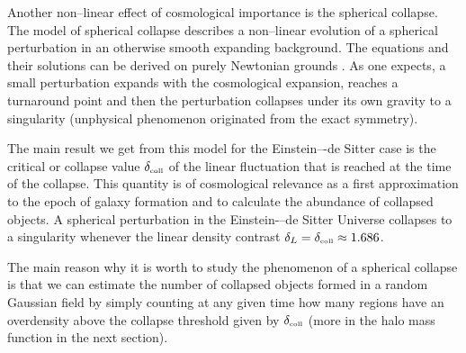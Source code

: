 Another non--linear effect of cosmological importance is the spherical collapse. The model of spherical collapse describes a non--linear evolution of a spherical perturbation in an otherwise smooth expanding background. The equations and their solutions can be derived on purely Newtonian grounds \parencite{2010deto.book.....A}. As one expects, a small perturbation expands with the cosmological expansion, reaches a turnaround point and then the perturbation collapses under its own gravity to a singularity (unphysical phenomenon originated from the exact symmetry).

The main result we get from this model for the Einstein–-de Sitter case is the critical or collapse value $\delta_\text{\tiny coll}$ of the linear fluctuation that is reached at the time of the collapse. This quantity is of cosmological relevance as a first approximation to the epoch of galaxy formation and to calculate the abundance of collapsed objects. A spherical perturbation in the Einstein-–de Sitter Universe collapses to a singularity whenever the linear density contrast $\delta_L=\delta_\text{\tiny coll}\approx1.686$.

The main reason why it is worth to study the phenomenon of a spherical collapse is that we can estimate the number of collapsed objects formed in a random Gaussian field by simply counting at any given time how many regions have an overdensity above the collapse threshold given by $\delta_\text{\tiny coll}$ (more in the halo mass function in the next section).
